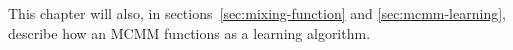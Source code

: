 
This chapter will also, in 
sections~\ref{sec:mixing-function} and \ref{sec:mcmm-learning}, describe how
an \ac{MCMM} functions as a learning algorithm. 

